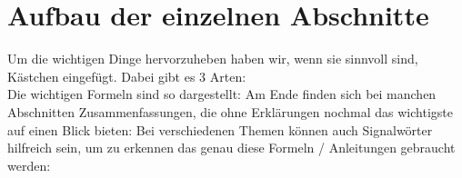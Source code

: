 	\section*{Aufbau der einzelnen Abschnitte}
		Um die wichtigen Dinge hervorzuheben haben wir, wenn sie sinnvoll sind,
		Kästchen eingefügt.
		Dabei gibt es 3 Arten:\\
		Die wichtigen Formeln sind so dargestellt:
		\formel{\[ e^{i\phi}+1=0 \]}
		Am Ende finden sich bei manchen Abschnitten Zusammenfassungen, die ohne
		Erklärungen nochmal das wichtigste auf einen Blick bieten:
		Bei verschiedenen Themen können auch Signalwörter hilfreich sein, um zu
		erkennen das genau diese Formeln / Anleitungen gebraucht werden:
